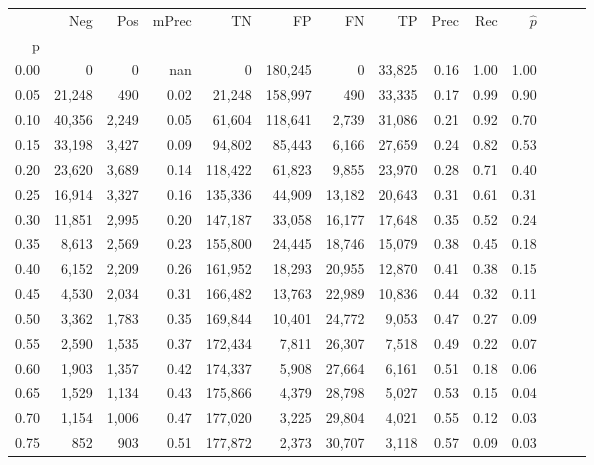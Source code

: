 \begin{tabular}{rrrrrrrrrrrrrr}
\toprule
{} &     Neg &    Pos & mPrec &       TN &       FP &      FN &      TP &  Prec &   Rec & $\hat{p}$ \\
p    &         &        &       &          &          &         &         &       &       &           \\
\midrule
0.00 &       0 &      0 &   nan &        0 &  180,245 &       0 &  33,825 &  0.16 &  1.00 &      1.00 \\
0.05 &  21,248 &    490 &  0.02 &   21,248 &  158,997 &     490 &  33,335 &  0.17 &  0.99 &      0.90 \\
0.10 &  40,356 &  2,249 &  0.05 &   61,604 &  118,641 &   2,739 &  31,086 &  0.21 &  0.92 &      0.70 \\
0.15 &  33,198 &  3,427 &  0.09 &   94,802 &   85,443 &   6,166 &  27,659 &  0.24 &  0.82 &      0.53 \\
0.20 &  23,620 &  3,689 &  0.14 &  118,422 &   61,823 &   9,855 &  23,970 &  0.28 &  0.71 &      0.40 \\
0.25 &  16,914 &  3,327 &  0.16 &  135,336 &   44,909 &  13,182 &  20,643 &  0.31 &  0.61 &      0.31 \\
0.30 &  11,851 &  2,995 &  0.20 &  147,187 &   33,058 &  16,177 &  17,648 &  0.35 &  0.52 &      0.24 \\
0.35 &   8,613 &  2,569 &  0.23 &  155,800 &   24,445 &  18,746 &  15,079 &  0.38 &  0.45 &      0.18 \\
0.40 &   6,152 &  2,209 &  0.26 &  161,952 &   18,293 &  20,955 &  12,870 &  0.41 &  0.38 &      0.15 \\
0.45 &   4,530 &  2,034 &  0.31 &  166,482 &   13,763 &  22,989 &  10,836 &  0.44 &  0.32 &      0.11 \\
0.50 &   3,362 &  1,783 &  0.35 &  169,844 &   10,401 &  24,772 &   9,053 &  0.47 &  0.27 &      0.09 \\
0.55 &   2,590 &  1,535 &  0.37 &  172,434 &    7,811 &  26,307 &   7,518 &  0.49 &  0.22 &      0.07 \\
0.60 &   1,903 &  1,357 &  0.42 &  174,337 &    5,908 &  27,664 &   6,161 &  0.51 &  0.18 &      0.06 \\
0.65 &   1,529 &  1,134 &  0.43 &  175,866 &    4,379 &  28,798 &   5,027 &  0.53 &  0.15 &      0.04 \\
0.70 &   1,154 &  1,006 &  0.47 &  177,020 &    3,225 &  29,804 &   4,021 &  0.55 &  0.12 &      0.03 \\
0.75 &     852 &    903 &  0.51 &  177,872 &    2,373 &  30,707 &   3,118 &  0.57 &  0.09 &      0.03 \\

\end{tabular}
